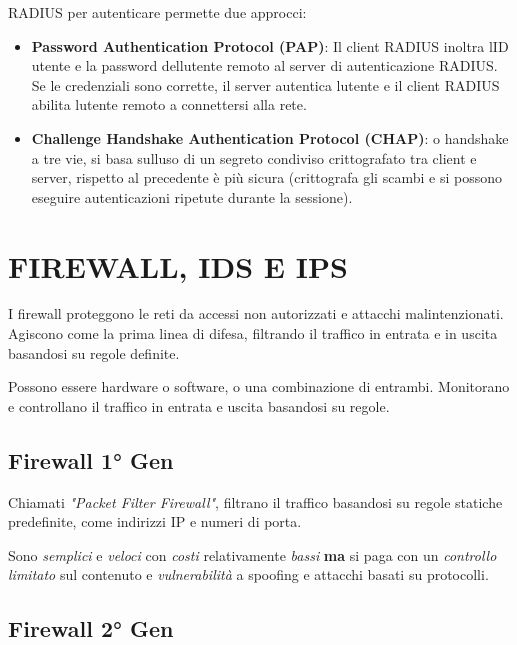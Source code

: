 RADIUS per autenticare permette due approcci:

\begin{itemize}
\item
  \textbf{Password Authentication Protocol (PAP)}: Il client RADIUS
  inoltra l\textquotesingle ID utente e la password
  dell\textquotesingle utente remoto al server di autenticazione RADIUS.
  Se le credenziali sono corrette, il server autentica
  l\textquotesingle utente e il client RADIUS abilita
  l\textquotesingle utente remoto a connettersi alla rete.
\item
  \textbf{Challenge Handshake Authentication Protocol (CHAP)}: o
  handshake a tre vie, si basa sull\textquotesingle uso di un segreto
  condiviso crittografato tra client e server, rispetto al precedente è
  più sicura (crittografa gli scambi e si possono eseguire
  autenticazioni ripetute durante la sessione).
\end{itemize}

\section{FIREWALL, IDS E IPS}\label{firewall-ids-e-ips}

I firewall proteggono le reti da accessi non autorizzati e attacchi
malintenzionati. Agiscono come la prima linea di difesa, filtrando il
traffico in entrata e in uscita basandosi su regole definite.

Possono essere hardware o software, o una combinazione di entrambi.
Monitorano e controllano il traffico in entrata e uscita basandosi su
regole.

\subsection{Firewall 1° Gen}\label{firewall-1-gen}

Chiamati \emph{"Packet Filter Firewall"}, filtrano il traffico basandosi
su regole statiche predefinite, come indirizzi IP e numeri di porta.

Sono \emph{semplici} e \emph{veloci} con \emph{costi} relativamente
\emph{bassi} \textbf{ma} si paga con un \emph{controllo limitato} sul
contenuto e \emph{vulnerabilità} a spoofing e attacchi basati su
protocolli.

\subsection{Firewall 2° Gen}\label{firewall-2-gen}

